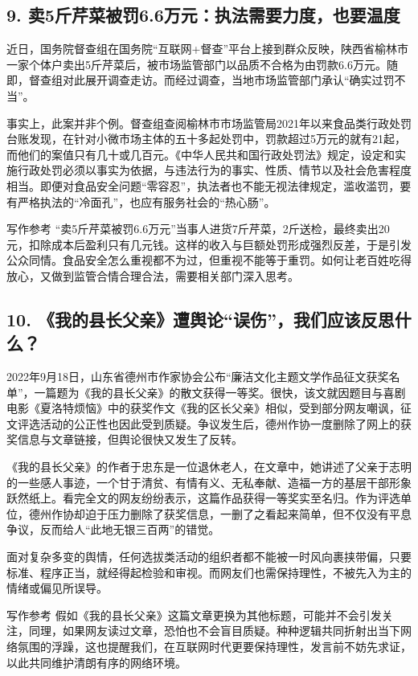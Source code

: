 \subsection*{9. 卖5斤芹菜被罚6.6万元：执法需要力度，也要温度}

近日，国务院督查组在国务院“互联网+督查”平台上接到群众反映，陕西省榆林市一家个体户卖出5斤芹菜后，被市场监管部门以品质不合格为由罚款6.6万元。随即，督查组对此展开调查走访。而经过调查，当地市场监管部门承认“确实过罚不当”。

事实上，此案并非个例。督查组查阅榆林市市场监管局2021年以来食品类行政处罚台账发现，在针对小微市场主体的五十多起处罚中，罚款超过5万元的就有21起，而他们的案值只有几十或几百元。《中华人民共和国行政处罚法》规定，设定和实施行政处罚必须以事实为依据，与违法行为的事实、性质、情节以及社会危害程度相当。即便对食品安全问题“零容忍”，执法者也不能无视法律规定，滥收滥罚，要有严格执法的“冷面孔”，也应有服务社会的“热心肠”。

\begin{quoteBox}{写作参考}
“卖5斤芹菜被罚6.6万元”当事人进货7斤芹菜，2斤送检，最终卖出20元，扣除成本后盈利只有几元钱。这样的收入与巨额处罚形成强烈反差，于是引发公众同情。食品安全怎么重视都不为过，但重视不能等于重罚。如何让老百姓吃得放心，又做到监管合情合理合法，需要相关部门深入思考。
\end{quoteBox}

\subsection*{10. 《我的县长父亲》遭舆论“误伤”，我们应该反思什么？}

2022年9月18日，山东省德州市作家协会公布“廉洁文化主题文学作品征文获奖名单”，一篇题为《我的县长父亲》的散文获得一等奖。很快，该文就因题目与喜剧电影《夏洛特烦恼》中的获奖作文《我的区长父亲》相似，受到部分网友嘲讽，征文评选活动的公正性也因此受到质疑。争议发生后，德州作协一度删除了网上的获奖信息与文章链接，但舆论很快又发生了反转。

《我的县长父亲》的作者于忠东是一位退休老人，在文章中，她讲述了父亲于志明的一些感人事迹，一个甘于清贫、有情有义、无私奉献、造福一方的基层干部形象跃然纸上。看完全文的网友纷纷表示，这篇作品获得一等奖实至名归。作为评选单位，德州作协却迫于压力删除了获奖信息，一删了之看起来简单，但不仅没有平息争议，反而给人“此地无银三百两”的错觉。

面对复杂多变的舆情，任何选拔类活动的组织者都不能被一时风向裹挟带偏，只要标准、程序正当，就经得起检验和审视。而网友们也需保持理性，不被先入为主的情绪或偏见所误导。

\begin{quoteBox}{写作参考}
假如《我的县长父亲》这篇文章更换为其他标题，可能并不会引发关注，同理，如果网友读过文章，恐怕也不会盲目质疑。种种逻辑共同折射出当下网络氛围的浮躁，这也提醒我们，在互联网时代更要保持理性，发言前不妨先求证，以此共同维护清朗有序的网络环境。
\end{quoteBox}
